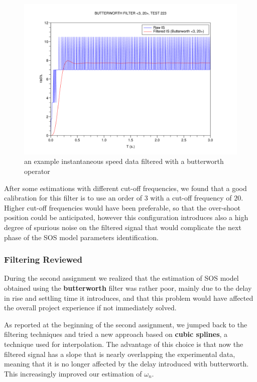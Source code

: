 \begin{figure}[htbp]
\center
  \includegraphics[scale=0.16]{FIGURES_1/butterworth.png}
  \caption[Butterworth Filter]{an example instantaneous speed data filtered with a butterworth operator}
  \label{fig:butterworthResult}
\end{figure}

After some estimations with different cut-off frequencies, we found that a good calibration for this filter is to use an order of $3$ with a cut-off frequency of $20$. Higher cut-off frequencies would have been preferable, so that the over-shoot position could be anticipated, however this configuration introduces also a high degree of spurious noise on the filtered signal that would complicate the next phase of the SOS model parameters identification.

\subsubsection{Filtering Reviewed}

During the second assignment we realized that the estimation of SOS model obtained using the \textbf{butterworth} filter was rather poor, mainly due to the delay in rise and settling time it introduces, and that this problem would have affected the overall project experience if not immediately solved.

As reported at the beginning of the second assignment, we jumped back to the filtering techniques and tried a new approach based on \textbf{cubic splines}, a technique used for interpolation. The advantage of this choice is that now the filtered signal has a slope that is nearly overlapping the experimental data, meaning that it is no longer affected by the delay introduced with butterworth. This increasingly improved our estimation of $\omega_n$. 

